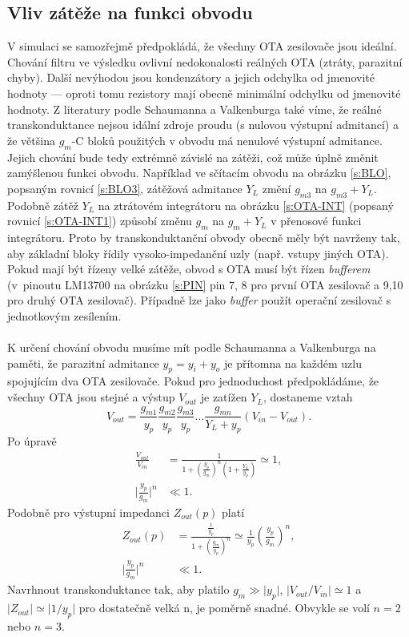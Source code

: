 \subsection{Vliv zátěže na funkci obvodu}
\noindent V simulaci se samozřejmě předpokládá, že všechny OTA zesilovače jsou ideální. Chování filtru ve výsledku ovlivní nedokonalosti reálných OTA (ztráty, parazitní chyby). Další nevýhodou jsou kondenzátory a jejich odchylka od jmenovité hodnoty --- oproti tomu rezistory mají obecně minimální odchylku od jmenovité hodnoty. Z literatury podle Schaumanna a Valkenburga \cite{13} také víme, že reálné transkonduktance nejsou idální zdroje proudu (s nulovou výstupní admitancí) a že většina $g_m$-C bloků použitých v obvodu má nenulové výstupní admitance. Jejich chování bude tedy extrémně závislé na zátěži, což může úplně změnit zamýšlenou funkci obvodu. Například ve sčítacím obvodu na obrázku \ref{s:BLO}, popsaným rovnicí \ref{s:BLO3}, zátěžová admitance $Y_L$ změní $g_{m3}$ na $g_{m3} + Y_L$. Podobně zátěž $Y_L$ na ztrátovém integrátoru na obrázku \ref{s:OTA-INT} (popsaný rovnicí \ref{s:OTA-INT1}) způsobí změnu $g_m$ na $g_m + Y_L$ v přenosové funkci integrátoru. Proto by transkonduktanční obvody obecně měly být navrženy tak, aby základní bloky řídily vysoko-impedanční uzly (např. vstupy jiných OTA). Pokud mají být řízeny velké zátěže, obvod s OTA musí být řízen \textit{bufferem} (v~pinoutu LM13700 na obrázku \ref{s:PIN} pin 7, 8 pro první OTA zesilovač a 9,10 pro druhý OTA zesilovač). Případně lze jako \textit{buffer} použít operační zesilovač s jednotkovým zesílením.\\
\\
\noindent K určení chování obvodu musíme mít podle Schaumanna a Valkenburga \cite{13} na paměti, že parazitní admitance $y_p = y_i + y_o$ je přítomna na každém uzlu spojujícím dva OTA zesilovače. Pokud pro jednoduchost předpokládáme, že všechny OTA jsou stejné a výstup $V_{out}$ je zatížen $Y_L$, dostaneme vztah
\begin{equation}
V_{out} = \frac{g_{m1}}{y_p}\frac{g_{m2}}{y_p}\frac{g_{m3}}{y_p} \ldots \frac{g_{mn}}{Y_L + y_p}(V_{in} - V_{out}).
\end{equation}
\noindent Po úpravě
\begin{align}
\frac{V_{out}}{V_{in}} &= \frac{1}{1 + (\frac{y_p}{g_m})^n(1 + \frac{Y_L}{y_p})} \simeq 1,\\
\lvert \frac{y_p}{g_m} \rvert ^n &\ll 1.
\end{align}
\noindent Podobně pro výstupní impedanci $Z_{out}(p)$ platí
\begin{align}
Z_{out}(p) &= \frac{\frac{1}{y_p}}{1 + (\frac{g_m}{y_p})^n} \simeq \frac{1}{y_p}(\frac{y_p}{g_m})^n,\\
\lvert \frac{y_p}{g_m} \rvert ^n &\ll 1.
\end{align}
\noindent Navrhnout transkonduktance tak, aby platilo $g_m \gg \lvert y_p \rvert$, $\lvert V_{out}/V_{in} \rvert  \simeq 1$ a $\lvert Z_{out} \rvert \simeq \lvert 1/y_p \rvert$ pro dostatečně velká n, je poměrně snadné. Obvykle se volí $n = 2$ nebo $n = 3$.
